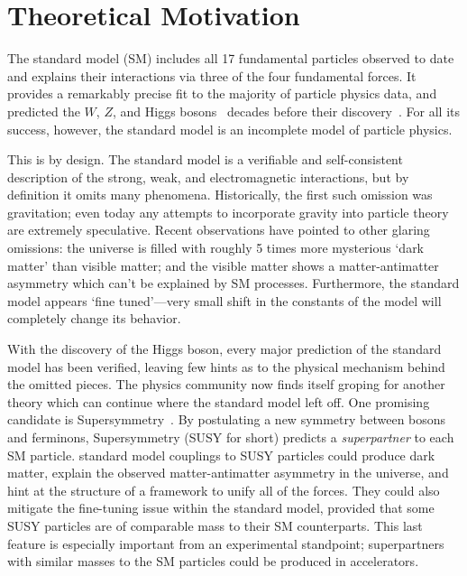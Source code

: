 \chapter{Theoretical Motivation}

The standard model (SM) includes all 17 fundamental particles observed to date and explains their interactions via three of the four fundamental forces.
It provides a remarkably precise fit to the majority of particle physics data, and predicted the $W$, $Z$, and Higgs bosons~\cite{wzmass1,higgs1,higgs2} decades before their discovery~\cite{ua1w,ua2w,ua1z,ua2z,atlashiggs,cmshiggs}.
For all its success, however, the standard model is an incomplete model of particle physics.

This is by design. The standard model is a verifiable and self-consistent description of the strong, weak, and electromagnetic interactions, but by definition it omits many phenomena.
Historically, the first such omission was gravitation; even today any attempts to incorporate gravity into particle theory are extremely speculative.
Recent observations have pointed to other glaring omissions:
the universe is filled with roughly 5 times more mysterious `dark matter' than visible matter;
and the visible matter shows a matter-antimatter asymmetry which can't be explained by SM processes.
Furthermore, the standard model appears `fine tuned'---very small shift in the constants of the model will completely change its behavior.

With the discovery of the Higgs boson, every major prediction of the standard model has been verified, leaving few hints as to the physical mechanism behind the omitted pieces.
The physics community now finds itself groping for another theory which can continue where the standard model left off. One promising candidate is Supersymmetry~\cite{susyprimer,srednicki,pdg2014}.
By postulating a new symmetry between bosons and ferminons, Supersymmetry (SUSY for short) predicts a \emph{superpartner} to each SM particle. standard model couplings to SUSY particles could produce dark matter, explain the observed matter-antimatter asymmetry in the universe, and hint at the structure of a framework to unify all of the forces.
They could also mitigate the fine-tuning issue within the standard model, provided that some SUSY particles are of comparable mass to their SM counterparts. This last feature is especially important from an experimental standpoint; superpartners with similar masses to the SM particles could be produced in accelerators.

